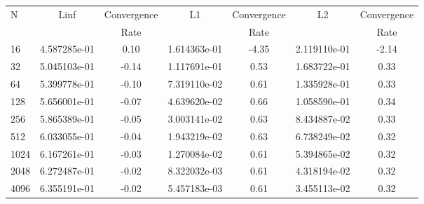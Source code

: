\documentclass[12pt]{article}
\begin{document}
	\begin{tabular}{l|c|c|c|c|c|c}
		N&Linf&Convergence&L1&Convergence&L2&Convergence\\
		&&Rate&&Rate&&Rate\\
		\hline
		16&4.587285e-01&0.10&1.614363e-01&-4.35&2.119110e-01&-2.14\\
		\hline
		32&5.045103e-01&-0.14&1.117691e-01&0.53&1.683722e-01&0.33\\
		\hline
		64&5.399778e-01&-0.10&7.319110e-02&0.61&1.335928e-01&0.33\\
		\hline
		128&5.656001e-01&-0.07&4.639620e-02&0.66&1.058590e-01&0.34\\
		\hline
		256&5.865389e-01&-0.05&3.003141e-02&0.63&8.434887e-02&0.33\\
		\hline
		512&6.033055e-01&-0.04&1.943219e-02&0.63&6.738249e-02&0.32\\
		\hline
		1024&6.167261e-01&-0.03&1.270084e-02&0.61&5.394865e-02&0.32\\
		\hline
		2048&6.272487e-01&-0.02&8.322032e-03&0.61&4.318194e-02&0.32\\
		\hline
		4096&6.355191e-01&-0.02&5.457183e-03&0.61&3.455113e-02&0.32\\
	\end{tabular}
\end{document}
